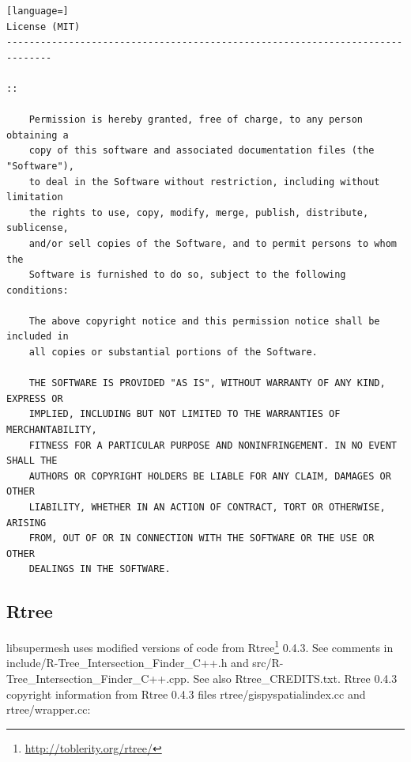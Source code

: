 \documentclass{article}
\begin{document}
\begin{lstlisting}[language=]
License (MIT)
------------------------------------------------------------------------------

::

    Permission is hereby granted, free of charge, to any person obtaining a
    copy of this software and associated documentation files (the "Software"),
    to deal in the Software without restriction, including without limitation
    the rights to use, copy, modify, merge, publish, distribute, sublicense,
    and/or sell copies of the Software, and to permit persons to whom the
    Software is furnished to do so, subject to the following conditions:

    The above copyright notice and this permission notice shall be included in
    all copies or substantial portions of the Software.

    THE SOFTWARE IS PROVIDED "AS IS", WITHOUT WARRANTY OF ANY KIND, EXPRESS OR
    IMPLIED, INCLUDING BUT NOT LIMITED TO THE WARRANTIES OF MERCHANTABILITY,
    FITNESS FOR A PARTICULAR PURPOSE AND NONINFRINGEMENT. IN NO EVENT SHALL THE
    AUTHORS OR COPYRIGHT HOLDERS BE LIABLE FOR ANY CLAIM, DAMAGES OR OTHER
    LIABILITY, WHETHER IN AN ACTION OF CONTRACT, TORT OR OTHERWISE, ARISING
    FROM, OUT OF OR IN CONNECTION WITH THE SOFTWARE OR THE USE OR OTHER
    DEALINGS IN THE SOFTWARE.
\end{lstlisting}

\subsection{Rtree}

libsupermesh uses modified versions of code from
Rtree\footnote{\url{http://toblerity.org/rtree/}} 0.4.3. See comments in
\linebreak include/R-Tree\_Intersection\_Finder\_C++.h and
src/R-Tree\_Intersection\_Finder\_C++.cpp. See also \linebreak
Rtree\_CREDITS.txt. Rtree 0.4.3 copyright information from Rtree 0.4.3 files
rtree/gispyspatialindex.cc and rtree/wrapper.cc:
\end{document}
